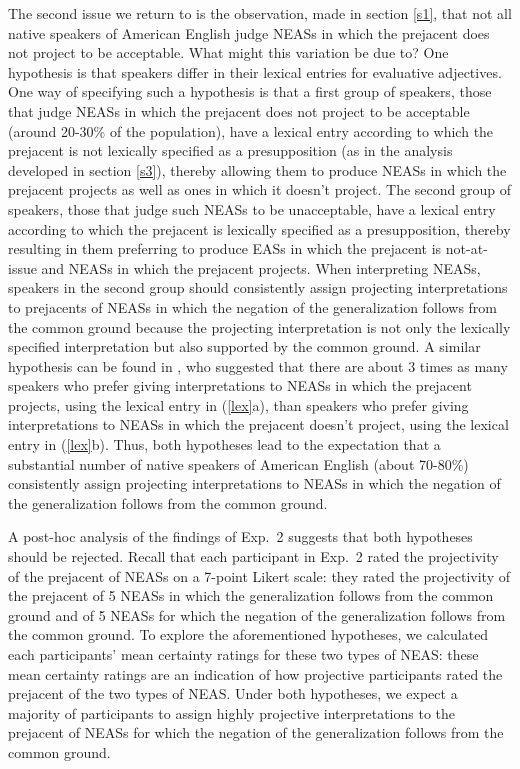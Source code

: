 \documentclass[11pt,fleqn]{article}
\newcommand{\6}{\mbox{$[\hspace*{-.6mm}[$}}
\newcommand{\9}{\mbox{$]\hspace*{-.6mm}]$}}
\begin{document}
The second issue we return to is the observation, made in section \ref{s1}, that not all native speakers of American English judge NEASs in which the prejacent does not project to be acceptable. What might this variation be due to? One hypothesis is that speakers differ in their lexical entries for evaluative adjectives. One way of specifying such a hypothesis is that a first group of speakers, those that judge NEASs in which the prejacent does not project to be acceptable (around 20-30\% of the population), have a lexical entry according to which the prejacent is not lexically specified as a presupposition (as in the analysis developed in section \ref{s3}), thereby allowing them to produce NEASs in which the prejacent projects as well as ones in which it doesn't project. The second group of speakers, those that judge such NEASs to be unacceptable, have a lexical entry according to which the prejacent is lexically specified as a presupposition, thereby resulting in them preferring to produce EASs in which the prejacent is not-at-issue and NEASs in which the prejacent projects. When interpreting NEASs, speakers in the second group should consistently assign projecting interpretations to prejacents of NEASs in which the negation of the generalization follows from the common ground because the projecting interpretation is not only the lexically specified interpretation but also supported by the common ground. A similar hypothesis can be found in \citet[243]{karttunen-etal2014}, who suggested that there are about 3 times as many speakers who prefer giving interpretations to NEASs in which the prejacent projects, using the lexical entry in (\ref{lex}a), than speakers who prefer giving interpretations to NEASs in which the prejacent doesn't project, using the lexical entry in (\ref{lex}b). Thus, both hypotheses lead to the expectation that a substantial number of native speakers of American English (about 70-80\%) consistently assign projecting interpretations to NEASs in which the negation of the generalization follows from the common ground.

A post-hoc analysis of the findings of Exp.~2 suggests that both hypotheses should be rejected. Recall that each participant in Exp.~2 rated the projectivity of the prejacent of NEASs on a 7-point Likert scale: they rated the projectivity of the prejacent of 5 NEASs in which the generalization follows from the common ground and of 5 NEASs for which the negation of the generalization follows from the common ground. To explore the aforementioned hypotheses, we calculated each participants' mean certainty ratings for these two types of NEAS: these mean certainty ratings are an indication of how projective participants rated the prejacent of the two types of NEAS. Under both hypotheses, we expect a majority of participants to assign highly projective interpretations to the prejacent of NEASs for which the negation of the generalization follows from the common ground. 
\end{document}
